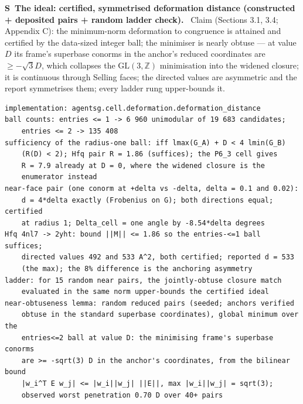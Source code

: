 \documentclass[11pt]{article}
\newcounter{scheck}
\renewcommand{\thescheck}{S\arabic{scheck}}
\newcommand{\sitem}[2]{\medskip\noindent\refstepcounter{scheck}\label{#1}\textbf{\thescheck\ #2.}\ }
\begin{document}
\sitem{z:deformation}{The ideal: certified, symmetrised deformation distance (constructed + deposited pairs + random ladder check)}
Claim (Sections 3.1, 3.4; Appendix C): the minimum-norm deformation to congruence is attained and certified by the data-sized integer ball; the minimiser is nearly obtuse --- at value $D$ its frame's superbase conorms in the anchor's reduced coordinates are $\ge-\sqrt3 D$, which collapses the $\mathrm{GL}(3,\mathbb Z)$ minimisation into the widened closure; it is continuous through Selling faces; the directed values are asymmetric and the report symmetrises them; every ladder rung upper-bounds it.
\begin{footnotesize}\begin{verbatim}
implementation: agentsg.cell.deformation.deformation_distance
ball counts: entries <= 1 -> 6 960 unimodular of 19 683 candidates;
    entries <= 2 -> 135 408
sufficiency of the radius-one ball: iff lmax(G_A) + D < 4 lmin(G_B)
    (R(D) < 2); Hfq pair R = 1.86 (suffices); the P6_3 cell gives
    R = 7.9 already at D = 0, where the widened closure is the
    enumerator instead
near-face pair (one conorm at +delta vs -delta, delta = 0.1 and 0.02):
    d = 4*delta exactly (Frobenius on G); both directions equal; certified
    at radius 1; Delta_cell = one angle by -8.54*delta degrees
Hfq 4nl7 -> 2yht: bound ||M|| <= 1.86 so the entries-<=1 ball suffices;
    directed values 492 and 533 A^2, both certified; reported d = 533
    (the max); the 8% difference is the anchoring asymmetry
ladder: for 15 random near pairs, the jointly-obtuse closure match
    evaluated in the same norm upper-bounds the certified ideal
near-obtuseness lemma: random reduced pairs (seeded; anchors verified
    obtuse in the standard superbase coordinates), global minimum over the
    entries<=2 ball at value D: the minimising frame's superbase conorms
    are >= -sqrt(3) D in the anchor's coordinates, from the bilinear bound
    |w_i^T E w_j| <= |w_i||w_j| ||E||, max |w_i||w_j| = sqrt(3);
    observed worst penetration 0.70 D over 40+ pairs
\end{verbatim}\end{footnotesize}
\end{document}
